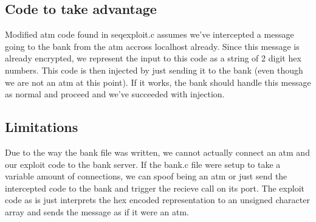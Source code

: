 	\subsection{Code to take advantage}\label{sec:takeadv}
		Modified atm code found in seqexploit.c assumes we've intercepted a message going to the bank from the atm accross localhost already. Since this message is already encrypted, we represent the input to this code as a string of 2 digit hex numbers. This code is then injected by just sending it to the bank (even though we are not an atm at this point). If it works, the bank should handle this message as normal and proceed and we've succeeded with injection.
		
		\subsection{Limitations}\label{sec:lims}
			Due to the way the bank file was written, we cannot actually connect an atm and our exploit code to the bank server. If the bank.c file were setup to take a  variable amount of connections, we can spoof being an atm or just send the intercepted code to the bank and trigger the recieve call on its port. The exploit code as is just interprets the hex encoded representation to an unsigned character array and sends the message as if it were an atm.